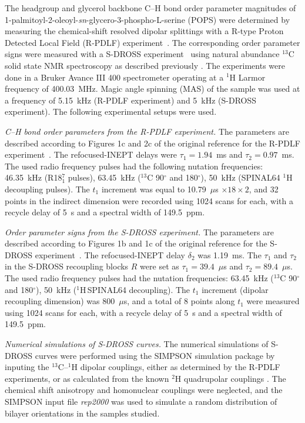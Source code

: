 \documentclass[aps,prl,superscriptaddress,twocolumn]{revtex4}
\begin{document}
The headgroup and glycerol backbone C--H bond order parameter magnitudes of 1-palmitoyl-2-oleoyl-{\it sn}-glycero-3-phospho-L-serine (POPS)
were determined by measuring the chemical-shift resolved dipolar splittings
with a R-type Proton Detected Local Field (R-PDLF) experiment~\cite{dvinskikh04}.
The corresponding order parameter signs were measured with a S-DROSS experiment~\cite{gross97}
using natural abundance $^{13}$C solid state NMR spectroscopy as described previously \cite{ferreira13,ferreira16}.
The experiments were done in a Bruker Avance III 400 spectrometer operating at a $^1$H Larmor frequency of 400.03~MHz.
Magic angle spinning (MAS) of the sample was used at a frequency of 5.15~kHz (R-PDLF experiment) and 5~kHz (S-DROSS experiment).
The following experimental setups were used.

{\emph{C--H bond order parameters from the R-PDLF experiment.}} The parameters are described according to Figures 1c and 2c of the original reference
for the R-PDLF experiment~\cite{dvinskikh04}.  The refocused-INEPT delays were $\tau_1=1.94$~ms and $\tau_2=0.97$~ms.
The used radio frequency pulses had the following nutation frequencies: 46.35~kHz (R18$^7_1$ pulses), 63.45~kHz ($^{13}$C 90$^{\circ}$ and 180$^{\circ}$),
50~kHz (SPINAL64 $^1$H decoupling pulses).
The $t_1$ increment was equal to 10.79~$\mu$s $\times18\times2$, and 32 points in the indirect
dimension were recorded using 1024 scans for each, with a recycle delay of 5~s and a spectral width of 149.5~ppm.

\emph{Order parameter signs from the S-DROSS experiment.}
The parameters are described according to Figures 1b and 1c of the original reference for the S-DROSS
experiment~\cite{gross97}. The refocused-INEPT delay $\delta_2$ was 1.19~ms. The $\tau_1$ and $\tau_2$ in the S-DROSS recoupling
blocks $R$ were set as $\tau_1=39.4$~$\mu$s and $\tau_2=89.4$~$\mu$s. The used radio frequency pulses had the nutation
frequencies: 63.45~kHz ($^{13}$C 90$^{\circ}$ and 180$^{\circ}$), 50~kHz ($^1$H\,SPINAL64 decoupling).
The $t_1$ increment (dipolar recoupling dimension) was 800~$\mu$s, and a total of 8 points along $t_1$ were
measured using 1024 scans for each, with a recycle delay of 5~s and a spectral width of 149.5~ppm.

\emph{Numerical simulations of S-DROSS curves.}
The numerical simulations of S-DROSS curves were performed using the SIMPSON simulation package \cite{bak00}
by inputing the $^{13}$C--$^1$H
dipolar couplings, either as determined by the R-PDLF experiments, or as calculated from the known $^2$H quadrupolar couplings \cite{browning80}.
The chemical shift anisotropy and homonuclear couplings were neglected, and the SIMPSON input file {\it{rep2000}} was used to simulate a random
distribution of bilayer orientations in the samples studied.
\end{document}
